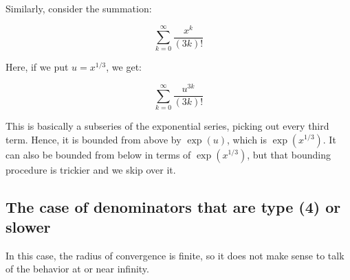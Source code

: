 \documentclass{amsart}
\begin{document}
Similarly, consider the summation:

$$\sum_{k=0}^\infty \frac{x^k}{(3k)!}$$

Here, if we put $u = x^{1/3}$, we get:

$$\sum_{k=0}^\infty \frac{u^{3k}}{(3k)!}$$

This is basically a subseries of the exponential series, picking out
every third term. Hence, it is bounded from above by $\exp(u)$, which
is $\exp(x^{1/3})$. It can also be bounded from below in terms of
$\exp(x^{1/3})$, but that bounding procedure is trickier and we skip over
it.
\subsection{The case of denominators that are type (4) or slower}

In this case, the radius of convergence is finite, so it does not make
sense to talk of the behavior at or near infinity.
\end{document}
